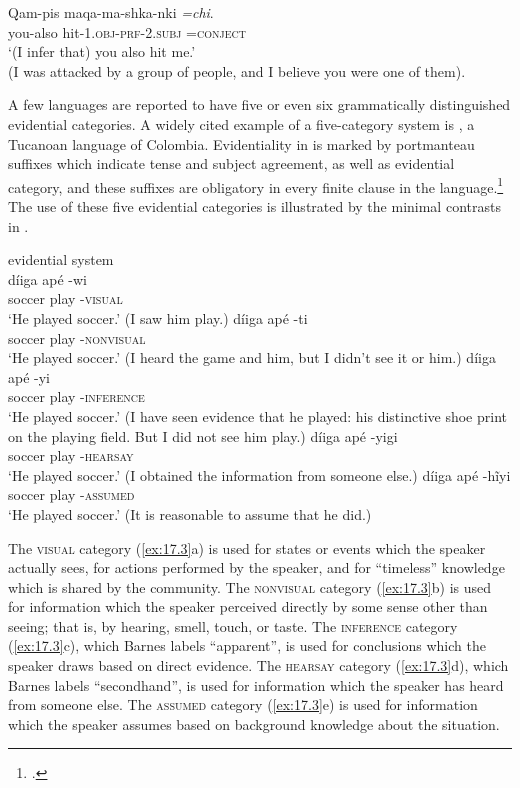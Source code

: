  \ex \gll Qam-pis  maqa-ma-shka-nki  \textit{=chi}.\\
you-also  hit-1\textsc{.obj}-\textsc{prf-2.subj}  \textsc{=conject}\\
\glt ‘(I infer that) you also hit me.’\\
(I was attacked by a group of people, and I believe you were one of them).
\z \z


A few languages are reported to have five or even six grammatically distinguished evidential categories. A widely cited example of a five-category system is , a  {Tucanoan} language of Colombia. Evidentiality in  is marked by portmanteau suffixes which indicate tense and subject agreement, as well as evidential category, and these suffixes are obligatory in every finite clause in the language.\footnote{\citet{Barnes1984}.} The use of these five evidential categories is illustrated by the minimal contrasts in .


\ea \label{ex:17.3}
{ evidential system} \citep{Barnes1984}\\
\ea  \gll  díiga  apé  -wi  \\
soccer  play  -\textsc{visual}\\
\glt ‘He played soccer.’ (I saw him play.)
\ex \gll díiga  apé  -ti\\
soccer  play  -\textsc{nonvisual}\\
\glt ‘He played soccer.’ (I heard the game and him, but I didn’t see it or him.)
\ex \gll  díiga  apé  -yi\\
soccer  play  -\textsc{inference}\\
\glt ‘He played soccer.’ (I have seen evidence that he played: his distinctive shoe print on the playing field. But I did not see him play.)
\ex \gll  díiga  apé  -yigi\\
soccer  play  -\textsc{hearsay}\\
\glt ‘He played soccer.’ (I obtained the information from someone else.)
\ex \gll  díiga  apé  -hĩyi\\
soccer  play  -\textsc{assumed}\\
\glt ‘He played soccer.’ (It is reasonable to assume that he did.)
\z \z

\largerpage %
The \textsc{visual} category (\ref{ex:17.3}a) is used for states or events which the speaker actually sees, for actions performed by the speaker, and for “timeless” knowledge which is shared by the community. The \textsc{nonvisual} category (\ref{ex:17.3}b) is used for information which the speaker perceived directly by some sense other than seeing; that is, by hearing, smell, touch, or taste. The \textsc{inference} category (\ref{ex:17.3}c), which Barnes labels “apparent”, is used for conclusions which the speaker draws based on direct evidence. The \textsc{hearsay} category (\ref{ex:17.3}d), which Barnes labels “secondhand”, is used for information which the speaker has heard from someone else. The \textsc{assumed} category (\ref{ex:17.3}e) is used for information which the speaker assumes based on background knowledge about the situation.


